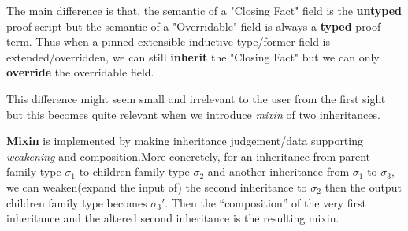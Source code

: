 The main difference is that, the semantic of a "Closing Fact" field is the \textbf{untyped} proof script but the semantic of a "Overridable" field is always a \textbf{typed} proof term. Thus when a pinned extensible inductive type/former field is extended/overridden, we can still \textbf{inherit} the "Closing Fact" but we can only \textbf{override} the overridable field.

This difference might seem small and irrelevant to the user from the first sight but this becomes quite relevant when we introduce \textit{mixin} of two inheritances.







\textbf{Mixin} is implemented by making inheritance judgement/data supporting \textit{weakening} and composition.More concretely,  for an inheritance from parent family type $\sigma_1$ to children family type ${\sigma_2}$ and another inheritance from ${\sigma_1}$ to ${\sigma_3}$, we can weaken(expand the input of) the second inheritance to ${\sigma_2}$ then the output children family type becomes ${\sigma_3'}$. Then the ``composition'' of the very first inheritance and the altered second inheritance is the resulting mixin. 

